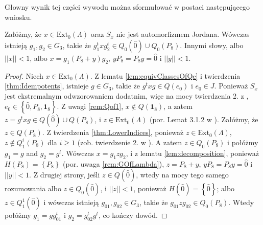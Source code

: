 Głowny wynik tej części wywodu można sformułować w postaci następującego wniosku.
\begin{Corollary}
\label{cor:q0}
    Załóżmy, że $x \in \text{Ext}_{0}(\Lambda)$ oraz $S_{x}$ nie jest
    automorfizmem Jordana.
    Wówczas istnieją $g_{1}, g_{2} \in G_{3}$,
    takie że $g_{1}^{t} x g_{2}^{t} \in Q_{0}(\hat{0}) \cup Q_{0}(P_{8})$.
    Innymi słowy, albo $||x|| < 1$,
    albo
    $x = g_{1} (P_{8} + y) g_{2}$,  $y P_{8} = P_{8} y = \hat{0}$
    i $|| y || < 1$.
\end{Corollary}
\begin{proof}
Niech $x \in  \text{Ext}_{0}(\Lambda)$.
    Z lematu \ref{lem:equivClassesOfQe} i twierdzenia \ref{thm:Idempotents},
    istnieje $g \in G_{3}$, takie że
    $g^{t} x g \in Q(e_{0})$ i $e_{0} \in J$.
    Ponieważ $S_{x}$ jest ekstremalnym odwzorowaniem dodatnim, więc na mocy
    twierdzenia 2. z \cite{miller2015stable},
    $e_{0} \in \left \{ \hat{0}, P_{8}, \mathbf{1}_{8} \right \}$.
    Z uwagi \ref{rem:Qof1}, $x \notin Q(\mathbf{1}_{8})$, a zatem
    $z = g^{t} x g \in Q(\hat{0}) \cup Q(P_{8})$,
    i $z \in \text{Ext}_{0}(\Lambda)$
    (por. Lemat 3.1.2 w \cite{Stormer2013}).
    Załóżmy, że $z \in Q(P_{8})$.
    Z twierdzenia \ref{thm:LowerIndices},
    ponieważ $z \in \text{Ext}_{0}(\Lambda)$,
    $z \notin Q_{1}^{i}(P_{8})$
    dla $i \geq 1$ (zob.  twierdzenie 2. w \cite{miller2015stable}).
    A zatem $z \in Q_{0}(P_{8})$ i połóżmy $g_{1} = g$ and $g_{2} = g^{t}$.
    Wówczas $x = g_{1} z g_{2}$,
    i z lematu \ref{lem:decomposition}, ponieważ
    $H(P_{8}) = \left \{ P_{8} \right \}$
    (por. uwaga \ref{rem:GOfLambda}),
    $z = P_{8} + y$,  $y P_{8} = P_{8} y = \hat{0}$ i $||y|| < 1$.
    Z drugiej strony, jeśli $z \in Q(\hat{0})$,
    wtedy na mocy tego samego rozumowania albo $z \in Q_{0}(\hat{0})$,
    i $||z|| < 1$, ponieważ $H(\hat{0}) = \left \{ \hat{0} \right \}$; albo
    $z \in Q_{1}^{1}(\hat{0})$ i wówczas istnieją $g_{01}, g_{02} \in G_{3}$,
    takie że $g_{01} z g_{02} \in Q_{0}(P_{8})$.
    Wtedy połóżmy $g_{1} = g g_{01}^{t}$ i $g_{2} = g_{02}^{t} g^{t}$,
    co kończy dowód.
\end{proof}

